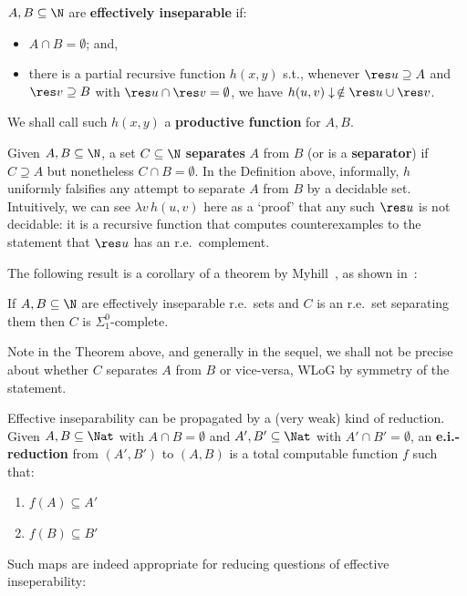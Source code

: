 \begin{definition}
$A,B\subseteq \N$ are \textbf{effectively inseparable} if:
\begin{itemize}
    \item $A \cap B = \emptyset$; and,
    \item there is a partial recursive function $h(x,y)$ s.t., whenever $\res u \supseteq A$ and $\res v \supseteq B$ with $\res u \cap \res v = \emptyset$, we have $h(u,v) \downarrow\,  \notin \res u \cup \res v$. 
\end{itemize}
We shall call such $h(x,y)$ a \textbf{productive function} for $A,B$.
\end{definition}


Given $A,B \subseteq \N$, a set $C\subseteq \N $ \textbf{separates} $A$ from $B$ (or is a \textbf{separator}) if $C\supseteq A$ but nonetheless $C\cap B = \emptyset$. 
In the Definition above, informally, $h$ uniformly falsifies any attempt to separate $A$ from $B$ by a decidable set.
Intuitively, we can see $\lambda v\,  h(u,v)$ here as a `proof' that any such $\res u$ is not decidable: it is a recursive function that computes counterexamples to the statement that $\res u$ has an r.e.\ complement.

The following result is a corollary of a theorem by Myhill~\cite{Myhill1955}, as shown in~\cite[Exercise 11-14]{Rogers1987}:
\begin{theorem}
\label{separator-of-eff-insep-sets-is-S01-complete}
If $A,B \subseteq \N $ are effectively inseparable r.e.\ sets and $C$ is an r.e.\ set separating them then $C$ is $\Sigma^0_1$-complete.
\end{theorem}

Note in the Theorem above, and generally in the sequel, we shall not be precise about whether $C$ separates $A$ from $B$ or vice-versa, WLoG by symmetry of the statement.


Effective inseparability can be propagated by a (very weak) kind of reduction.
Given $A,B\subseteq \Nat$ with $A\cap B = \emptyset$ and $A', B'\subseteq \Nat$ with $A' \cap B' = \emptyset$, an \textbf{e.i.-reduction} from $(A',B')$ to $(A,B)$ is a total computable function $f$ such that: 
\begin{enumerate}
\item\label{item:f(A)-in-A'} $f(A) \subseteq A'$
\item\label{item:f(B)-in-B'} $f(B) \subseteq B'$
\end{enumerate}
Such maps are indeed appropriate for reducing questions of effective inseperability:

